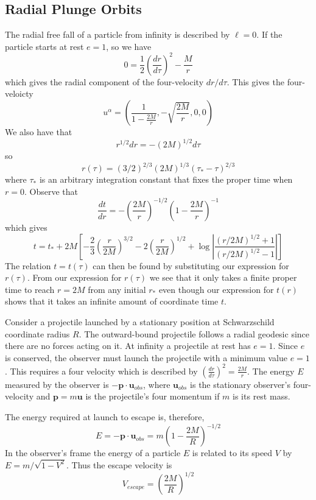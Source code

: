 \subsection{Radial Plunge Orbits}

The radial free fall of a particle from infinity is described by $\ell = 0$. If the particle starts at rest $e = 1$, so we have $$0 = \frac{1}{2}\left(\frac{dr}{d\tau}\right)^2-\frac{M}{r}$$
which gives the radial component of the four-velocity $dr/d\tau$. This gives the four-veloicty $$u^{\alpha} = \left(\frac{1}{1-\frac{2M}{r}},-\sqrt{\frac{2M}{r}},0,0\right)$$
We also have that $$r^{1/2}dr = -(2M)^{1/2}d\tau$$
so $$r(\tau) = (3/2)^{2/3}(2M)^{1/3}(\tau_*-\tau)^{2/3}$$
where $\tau_*$ is an arbitrary integration constant that fixes the proper time when $r = 0$. Observe that \begin{equation*}
    \frac{dt}{dr} = -\left(\frac{2M}{r}\right)^{-1/2}\left(1-\frac{2M}{r}\right)^{-1}
\end{equation*}
which gives $$t= t_*+2M\left[-\frac{2}{3}\left(\frac{r}{2M}\right)^{3/2}-2\left(\frac{r}{2M}\right)^{1/2}+\log\left|\frac{(r/2M)^{1/2}+1}{(r/2M)^{1/2}-1}\right|\right]$$
The relation $t=t(\tau)$ can then be found by substituting our expression for $r(\tau)$. From our expression for $r(\tau)$ we see that it only takes a finite proper time to reach $r = 2M$ from any initial $r_*$ even though our expression for $t(r)$ shows that it takes an infinite amount of coordinate time $t$.

\begin{eg}
    Consider a projectile launched by a stationary position at Schwarzschild coordinate radius $R$. The outward-bound projectile follows a radial geodesic since there are no forces acting on it. At infinity a projectile at rest has $e  =1$. Since $e$ is conserved, the observer must launch the projectile with a minimum value $e = 1$. This requires a four velocity which is described by $\left(\frac{dr}{d\tau}\right)^2 = \frac{2M}{r}$. The energy $E$ measured by the observer is $-\mathbf{p}\cdot\mathbf{u}_{obs}$, where $\mathbf{u}_{obs}$ is the stationary observer's four-velocity and $\mathbf{p} = m\mathbf{u}$ is the projectile's four momentum if $m$ is its rest mass.
    
    The energy required at launch to escape is, therefore, $$E = -\mathbf{p}\cdot\mathbf{u}_{obs} = m\left(1-\frac{2M}{R}\right)^{-1/2}$$
    In the observer's frame the energy of a particle $E$ is related to its speed $V$ by $E = m/\sqrt{1-V^2}$. Thus the escape velocity is $$V_{escape} = \left(\frac{2M}{R}\right)^{1/2}$$
\end{eg}


